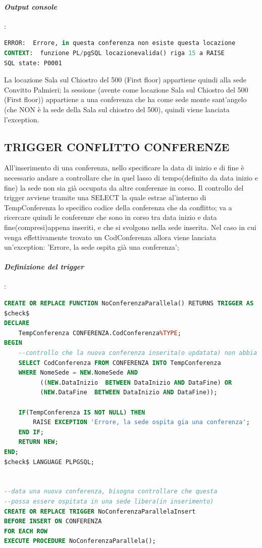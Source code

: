 \documentclass[a4page]{article}
\begin{document}
\paragraph{\textit{Output console}}:
\begin{lstlisting}[language=SQL,
        deletekeywords={IDENTITY,INT},
        morekeywords={clustered},    
        framesep=10pt,
        framextopmargin=10pt]
ERROR:  Errore, in questa conferenza non esiste questa locazione
CONTEXT:  funzione PL/pgSQL locazionevalida() riga 15 a RAISE
SQL state: P0001        
\end{lstlisting}
La locazione Sala sul Chiostro del 500 (First floor) appartiene quindi alla sede Convitto Palmieri; la sessione (avente come locazione Sala sul Chiostro del 500 (First floor)) appartiene a una conferenza che ha come sede monte sant'angelo (che NON è la sede della Sala sul chiostro del 500), quindi viene lanciata l'exception.	
\subsection{TRIGGER CONFLITTO CONFERENZE}
All'inserimento di una conferenza, nello specificare la data di inizio e di fine è necessario andare a controllare che in quel lasso di tempo(definito da data inizio e fine) la sede non sia già occupata da altre conferenze in corso. Il controllo del trigger avviene tramite una SELECT la quale estrae al'interno di TempConferenza lo specifico codice della conferenza che da conflitto; va a ricercare quindi le conferenze che sono in corso tra data inizio e data fine(compresi)appena inseriti, e che si svolgono nella sede inserita. Nel caso in cui venga effettivamente trovato un CodConferenza allora viene lanciata un'exception: 'Errore, la sede ospita già una conferenza';
\vspace{0.3cm}
\paragraph{\textit{Definizione del trigger}}:
\begin{lstlisting}[language=SQL,
        deletekeywords={IDENTITY,INT},
        morekeywords={clustered},    
        framesep=10pt,
        framextopmargin=10pt]
CREATE OR REPLACE FUNCTION NoConferenzaParallela() RETURNS TRIGGER AS
$check$
DECLARE 
	TempConferenza CONFERENZA.CodConferenza%TYPE;
BEGIN
	--controllo che la nuova conferenza inserita(o updatata) non abbia la sede occupata in quella data	
	SELECT CodConferenza FROM CONFERENZA INTO TempConferenza
	WHERE NomeSede = NEW.NomeSede AND							
		  ((NEW.DataInizio  BETWEEN DataInizio AND DataFine) OR	
		  (NEW.DataFine  BETWEEN DataInizio AND DataFine));
	
	IF(TempConferenza IS NOT NULL) THEN
		RAISE EXCEPTION 'Errore, la sede ospita gia una conferenza';
	END IF;
	RETURN NEW;
END;
$check$ LANGUAGE PLPGSQL;		  


--data una nuova conferenza, bisogna controllare che questa
--possa essere ospitata in una sede libera(in inserimento)
CREATE OR REPLACE TRIGGER NoConferenzaParallelaInsert
BEFORE INSERT ON CONFERENZA
FOR EACH ROW
EXECUTE PROCEDURE NoConferenzaParallela(); 
\end{lstlisting}
\end{document}
